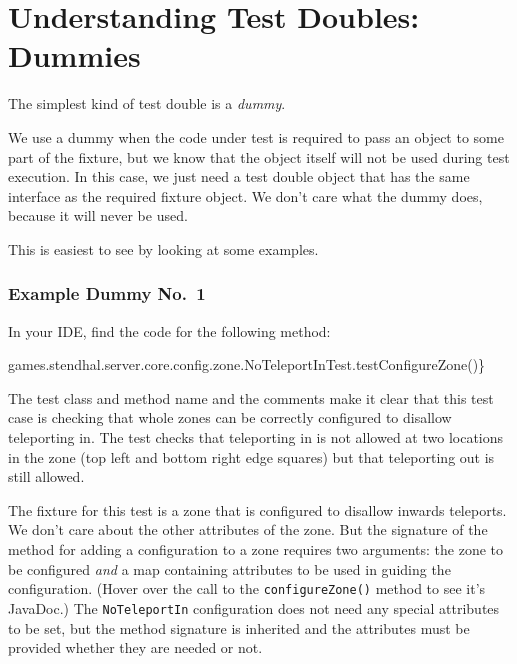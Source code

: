 \documentclass[
]{book}
\newenvironment{Shaded}{\begin{snugshade}}{\end{snugshade}}
\newcommand{\FunctionTok}[1]{\textcolor[rgb]{0.00,0.00,0.00}{#1}}
\newcommand{\NormalTok}[1]{#1}
\begin{document}
\hypertarget{dummies}{%
\section{Understanding Test Doubles: Dummies}\label{dummies}}

The simplest kind of test double is a \emph{dummy}.

We use a dummy when the code under test is required to pass an object to some part of the fixture, but we know that the object itself will not be used during test execution. In this case, we just need a test double object that has the same interface as the required fixture object. We don't care what the dummy does, because it will never be used.

This is easiest to see by looking at some examples.

\hypertarget{dummy1}{%
\subsubsection{Example Dummy No.~1}\label{dummy1}}

In your IDE, find the code for the following method:

\begin{Shaded}
\begin{Highlighting}[]
\NormalTok{games.}\FunctionTok{stendhal}\NormalTok{.}\FunctionTok{server}\NormalTok{.}\FunctionTok{core}\NormalTok{.}\FunctionTok{config}\NormalTok{.}\FunctionTok{zone}\NormalTok{.}\FunctionTok{NoTeleportInTest}\NormalTok{.}\FunctionTok{testConfigureZone}\NormalTok{()\}}
\end{Highlighting}
\end{Shaded}

The test class and method name and the comments make it clear that this test case is checking that whole zones can be correctly configured to disallow teleporting in. The test checks that teleporting in is not allowed at two locations in the zone (top left and bottom right edge squares) but that teleporting out is still allowed.

The fixture for this test is a zone that is configured to disallow inwards teleports. We don't care about the other attributes of the zone. But the signature of the method for adding a configuration to a zone requires two arguments: the zone to be configured \emph{and} a map containing attributes to be used in guiding the configuration. (Hover over the call to the \texttt{configureZone()} method to see it's JavaDoc.) The \texttt{NoTeleportIn} configuration does not need any special attributes to be set, but the method signature is inherited and the attributes must be provided whether they are needed or not.
\end{document}
